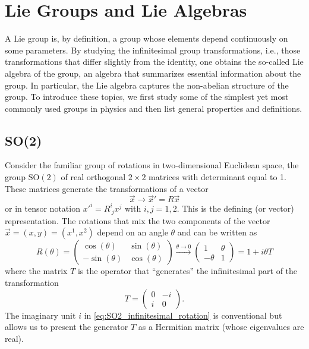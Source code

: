 \section{Lie Groups and Lie Algebras}

A Lie group is, by definition, a group whose elements depend continuously on some parameters. By studying the infinitesimal group transformations, i.e., those transformations that differ slightly from the identity, one obtains the so-called Lie algebra of the group, an algebra that summarizes essential information about the group. In particular, the Lie algebra captures the non-abelian structure of the group. To introduce these topics, we first study some of the simplest yet most commonly used groups in physics and then list general properties and definitions.

\subsection{SO(2)}

Consider the familiar group of rotations in two-dimensional Euclidean space, the group \(\mathrm{SO}(2)\) of real orthogonal $2 \times 2$ matrices with determinant equal to 1. These matrices generate the transformations of a vector
\[
    \vec{x} \rightarrow \vec{x}' = R \vec{x}
\]
or in tensor notation $x'^{i} = R^{i}_{\ j} x^{j}$ with $i,j = 1,2$. This is the defining (or vector) representation. The rotations that mix the two components of the vector $\vec{x} = (x, y) = (x^1, x^2)$ depend on an angle $\theta$ and can be written as
\begin{equation}
    R(\theta) =
    \begin{pmatrix}
        \cos(\theta)  & \sin(\theta) \\
        -\sin(\theta) & \cos(\theta)
    \end{pmatrix}
    \xrightarrow{\theta \to 0}
    \begin{pmatrix}
        1       & \theta \\
        -\theta & 1
    \end{pmatrix} = 1 + i \theta T
    \label{eq:SO2_infinitesimal_rotation}
\end{equation}
where the matrix $T$ is the operator that ``generates'' the infinitesimal part of the transformation
\begin{equation}
    T = \begin{pmatrix}
        0 & -i \\
        i & 0
    \end{pmatrix}.
    \label{eq:SO2_generator}
\end{equation}
The imaginary unit $i$ in \eqref{eq:SO2_infinitesimal_rotation} is conventional but allows us to present the generator $T$ as a Hermitian matrix (whose eigenvalues are real).

